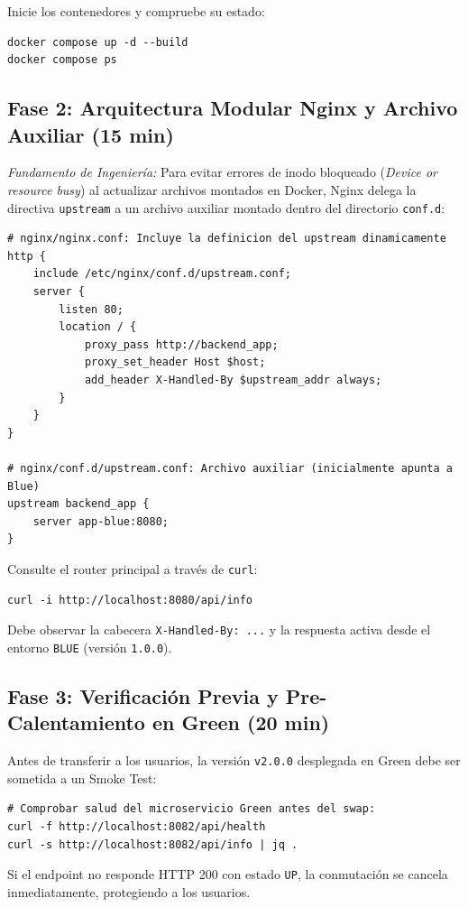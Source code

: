 \documentclass[10pt,letterpaper]{article}
\begin{document}
Inicie los contenedores y compruebe su estado:
\begin{lstlisting}[style=bashstyle]
docker compose up -d --build
docker compose ps
\end{lstlisting}

\subsection{Fase 2: Arquitectura Modular Nginx y Archivo Auxiliar (15 min)}
\textit{Fundamento de Ingeniería:} Para evitar errores de inodo bloqueado (\textit{Device or resource busy}) al actualizar archivos montados en Docker, Nginx delega la directiva \texttt{upstream} a un archivo auxiliar montado dentro del directorio \texttt{conf.d}:
\begin{lstlisting}[style=codeStyle]
# nginx/nginx.conf: Incluye la definicion del upstream dinamicamente
http {
    include /etc/nginx/conf.d/upstream.conf;
    server {
        listen 80;
        location / {
            proxy_pass http://backend_app;
            proxy_set_header Host $host;
            add_header X-Handled-By $upstream_addr always;
        }
    }
}

# nginx/conf.d/upstream.conf: Archivo auxiliar (inicialmente apunta a Blue)
upstream backend_app {
    server app-blue:8080;
}
\end{lstlisting}

Consulte el router principal a través de \texttt{curl}:
\begin{lstlisting}[style=bashstyle]
curl -i http://localhost:8080/api/info
\end{lstlisting}
Debe observar la cabecera \texttt{X-Handled-By: ...} y la respuesta activa desde el entorno \texttt{BLUE} (versión \texttt{1.0.0}).

\newpage

\subsection{Fase 3: Verificación Previa y Pre-Calentamiento en Green (20 min)}
Antes de transferir a los usuarios, la versión \texttt{v2.0.0} desplegada en Green debe ser sometida a un Smoke Test:
\begin{lstlisting}[style=bashstyle]
# Comprobar salud del microservicio Green antes del swap:
curl -f http://localhost:8082/api/health
curl -s http://localhost:8082/api/info | jq .
\end{lstlisting}
Si el endpoint no responde HTTP 200 con estado \texttt{UP}, la conmutación se cancela inmediatamente, protegiendo a los usuarios.
\end{document}
